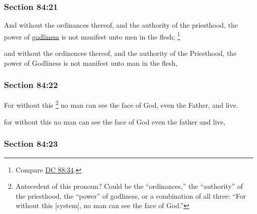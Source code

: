 	\subsubsection{Section 84:21} %
		\label{DC84-21}

		And without the ordinances thereof, and the authority of the priesthood, the power of \hyperref[GODLINESS]{godliness} is not manifest unto men in the flesh;%
			\footnote{%
				Compare \hyperref[DC88-34]{DC 88:34}.
				}

		\begin{framed}
		\scriptsize
			\begin{compactdesc}
				\item[JSP] and without the ordinences thereof, and the authority of the Priesthood, the power of Godliness is not manifest unto man in the flesh,
			\end{compactdesc}
		\end{framed}

	\subsubsection{Section 84:22} %
		\label{DC84-22}

		For without this%
			\footnote{%
				Antecedent of this pronoun? Could be the ``ordinances,'' the ``authority'' of the priesthood, the ``power'' of godliness, or a combination of all three: ``For without this [system], no man can see the face of God.''
				}
		no man can see the face of God, even the Father, and live.

		\begin{framed}
		\scriptsize
			\begin{compactdesc}
				\item[JSP] for without this no man can see the face of God even the father and live,
			\end{compactdesc}
		\end{framed}

	\subsubsection{Section 84:23} %
		\label{DC84-23}

